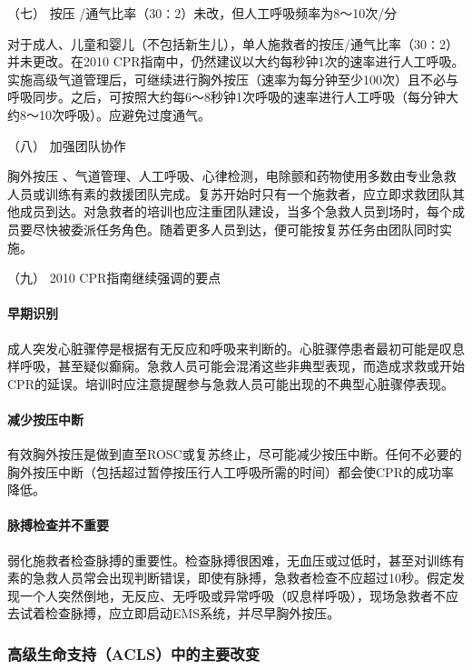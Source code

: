 \hypertarget{text00282.htmlux5cux23CHP10-1-3-2-7}{}
（七） 按压 /通气比率（30∶2）未改，但人工呼吸频率为8～10次/分

对于成人、儿童和婴儿（不包括新生儿），单人施救者的按压/通气比率（30∶2）并未更改。在2010
CPR指南中，仍然建议以大约每秒钟1次的速率进行人工呼吸。实施高级气道管理后，可继续进行胸外按压（速率为每分钟至少100次）且不必与呼吸同步。之后，可按照大约每6～8秒钟1次呼吸的速率进行人工呼吸（每分钟大约8～10次呼吸）。应避免过度通气。

\hypertarget{text00282.htmlux5cux23CHP10-1-3-2-8}{}
（八） 加强团队协作

胸外按压
、气道管理、人工呼吸、心律检测，电除颤和药物使用多数由专业急救人员或训练有素的救援团队完成。复苏开始时只有一个施救者，应立即求救团队其他成员到达。对急救者的培训也应注重团队建设，当多个急救人员到场时，每个成员要尽快被委派任务角色。随着更多人员到达，便可能按复苏任务由团队同时实施。

\hypertarget{text00282.htmlux5cux23CHP10-1-3-2-9}{}
（九） 2010 CPR指南继续强调的要点

\paragraph{早期识别}

成人突发心脏骤停是根据有无反应和呼吸来判断的。心脏骤停患者最初可能是叹息样呼吸，甚至疑似癫痫。急救人员可能会混淆这些非典型表现，而造成求救或开始CPR的延误。培训时应注意提醒参与急救人员可能出现的不典型心脏骤停表现。

\paragraph{减少按压中断}

有效胸外按压是做到直至ROSC或复苏终止，尽可能减少按压中断。任何不必要的胸外按压中断（包括超过暂停按压行人工呼吸所需的时间）都会使CPR的成功率降低。

\paragraph{脉搏检查并不重要}

弱化施救者检查脉搏的重要性。检查脉搏很困难，无血压或过低时，甚至对训练有素的急救人员常会出现判断错误，即使有脉搏，急救者检查不应超过10秒。假定发现一个人突然倒地，无反应、无呼吸或异常呼吸（叹息样呼吸），现场急救者不应去试着检查脉搏，应立即启动EMS系统，并尽早胸外按压。

\subsubsection{高级生命支持（ACLS）中的主要改变}

